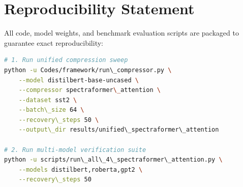 \section{Reproducibility Statement}
All code, model weights, and benchmark evaluation scripts are packaged to guarantee exact reproducibility:
\begin{lstlisting}[language=bash]
# 1. Run unified compression sweep
python -u Codes/framework/run\_compressor.py \
    --model distilbert-base-uncased \
    --compressor spectraformer\_attention \
    --dataset sst2 \
    --batch\_size 64 \
    --recovery\_steps 50 \
    --output\_dir results/unified\_spectraformer\_attention

# 2. Run multi-model verification suite
python -u scripts/run\_all\_4\_spectraformer\_attention.py \
    --models distilbert,roberta,gpt2 \
    --recovery\_steps 50
\end{lstlisting}
